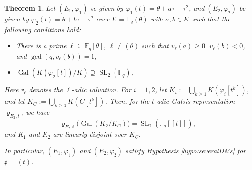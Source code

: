 \documentclass[10pt,a4paper]{amsart}
\theoremstyle{plain} %
\newtheorem{Theorem}{Theorem}[section]
\theoremstyle{definition}
\theoremstyle{remark}
\newcommand{\FF}{\mathbb{F}}
\newcommand{\fp}{\mathfrak{p}}  %
\newcommand{\Fq}{\FF_{\!q}}  %
\newcommand{\Gal}{\operatorname{Gal}}
\newcommand{\SL}{\operatorname{SL}}
\newcommand{\ps}[1]{[\![#1]\!]}  %
\numberwithin{equation}{subsection}
\begin{document}
\begin{Theorem}
Let $(E_1, \varphi_1)$ be given by $\varphi_1(t)=\theta+a\tau-\tau^2$, and $(E_2, \varphi_2)$ be given by $\varphi_2(t)=\theta+b\tau-\tau^2$ over $K=\Fq(\theta)$ with $a,b\in K$ such that the following conditions hold:
\begin{itemize}
\item There is a prime $\ell\subseteq \Fq[\theta]$, $\ell\neq (\theta)$ such that $v_\ell(a)\geq 0$, $v_\ell(b)<0$, and $\operatorname{gcd}(q, v_\ell(b))=1$,
\item $\Gal(K(\varphi_2[t])/K)\supseteq \SL_2(\Fq)$,
\end{itemize}
Here $v_\ell$ denotes the $\ell$-adic valuation. For $i=1,2$, let  
$K_{i}:=\bigcup_{k\geq 1} K(\varphi_i[t^k])$, and let $ K_{C}:= \bigcup_{k\geq 1} K(C[t^k])$. 
Then, for the $t$-adic Galois representation $\varrho_{E_2,t}$, we have
\[ \varrho_{E_2,t}\bigl( \Gal(K_{2}/K_{C}) \bigr) = \SL_2(\Fq\ps{t}), \]
and $K_{1}$ and $K_{2}$ are linearly disjoint over $K_{C}$.

In particular, $(E_1,\varphi_1)$ and $(E_2, \varphi_2)$ satisfy Hypothesis \ref{hypo:severalDMs} for $\fp=(t)$.
\end{Theorem}
\end{document}
